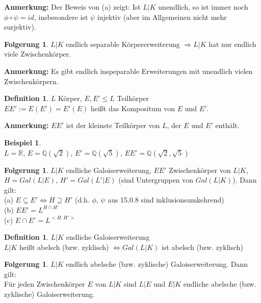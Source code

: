 \documentclass[10pt,a4paper,numbers=endperiod]{scrreprt}
\theoremstyle{definition}
\newtheorem{defi}[satz]{Definition}
\newtheorem{bsp}[satz]{Beispiel}
\newtheorem{folg}[satz]{Folgerung}
\def\QQ{{\mathbb Q}}
\def\RR{{\mathbb R}}
\begin{document}
\textbf{Anmerkung:} Der Beweis von (a) zeigt: Ist $L|K$ unendlich, so ist immer noch $\phi \circ \psi = id$, insbesondere ist $\psi$ injektiv (aber im Allgemeinen nicht mehr surjektiv).

\begin{folg}
	$L|K$ endlich separable Körpererweiterung $\Rightarrow L|K$ hat nur endlich viele Zwischenkörper.
\end{folg}

\textbf{Anmerkung:} Es gibt endlich inspeparable Erweiterungen mit unendlich vielen Zwischenkörpern.\\

\begin{defi}
	$L$ Körper, $E, E' \leq L$ Teilkörper\\
	$EE' := E(E') = E'(E)$ heißt das Kompositum von $E$ und $E'$.
\end{defi}

\textbf{Anmerkung:} $EE'$ ist der kleinste Teilkörper von $L$, der $E$ und $E'$ enthält.\\

\begin{bsp}
	$ $\\
	$L = \RR$, $E = \QQ(\sqrt{2})$, $E' = \QQ(\sqrt{5})$, $EE' = \QQ(\sqrt{2}, \sqrt{5})$
\end{bsp}

\begin{folg}
	$L|K$ endliche Galoiserweiterung, $EE'$ Zwischenkörper von $L|K$, $H = Gal(L|E)$, $H'= Gal(L'|E)$ (sind Untergruppen von $Gal(L|K)$). Dann gilt:\\
	(a) $E \subseteq E' \Leftrightarrow H \supseteq H'$ (d.h. $\phi$, $\psi$ aus 15.0.8 sind inklusionsumkehrend)\\
	(b) $EE' = L^{H \cap H'}$\\
	(c) $E \cap E' = L^{<H,H'>}$
\end{folg}

\begin{defi}
	$L|K$ endliche Galoiserweiterung\\
	$L|K$ heißt abelsch (bzw. zyklisch) $\Leftrightarrow Gal(L|K)$ ist abelsch (bzw. zyklisch)
\end{defi}

\begin{folg}
	$L|K$ endlich abelsche (bzw. zyklische) Galoiserweiterung. Dann gilt:\\
	Für jeden Zwischenkörper $E$ von $L|K$ sind $L|E$ und $E|K$ endliche abelsche (bzw. zyklische) Galoiserweiterung. 
\end{folg}
\end{document}
